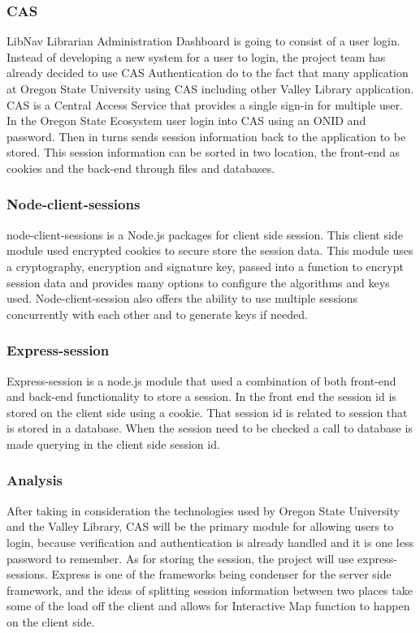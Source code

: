 \documentclass[letterpaper,10pt,titlepage, onecolumn, compsoc]{IEEEtran}
\begin{document}
\subsubsection{CAS}
LibNav Librarian Administration Dashboard is going to consist of a user login. Instead of developing a new system for a user to login, the project team has already decided to use CAS Authentication do to the fact that many application at Oregon State University using CAS including other Valley Library application.  CAS is a Central Access Service that provides a single sign-in for multiple user. In the Oregon State Ecosystem user login into CAS using an ONID and password. Then in turns sends session information back to the application to be stored. This session information can be sorted in two location, the front-end as cookies and the back-end through files and databases. 

\subsubsection{Node-client-sessions}
node-client-sessions is a Node.js packages for client side session. This client side module used encrypted cookies to secure store the session data. This module uses a cryptography, encryption and signature key, passed into a function to encrypt session data and provides many options to configure the algorithms and keys used. Node-client-session also offers the ability to use multiple sessions concurrently with each other and to generate keys if needed. \cite{mozilla2016}

\subsubsection{Express-session}
Express-session is a node.js module that used a combination of both front-end and back-end functionality to store a session. In the front end the session id is stored on the client side using a cookie. That session id is related to session that is stored in a database. When the session need to be checked a call to database is made querying in the client side session id. \cite{expressjs2016}

\subsubsection{Analysis}
After taking in consideration the technologies used by Oregon State University and the Valley Library, CAS will be the primary module for allowing users to login, because verification and authentication is already handled and it is one less password to remember. As for storing the session, the project will use express-sessions. Express is one of the frameworks being condenser for the server side framework, and the ideas of splitting session information between two places take some of the load off the client and allows for Interactive Map function to happen on the client side. 
\end{document}
